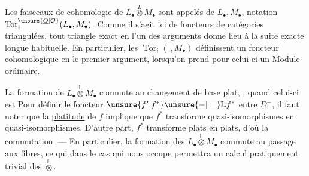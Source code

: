 Les  faisceaux de cohomologie de $L_\bullet\overset{L}{\otimes}M_\bullet$ sont appelés \uline{} de $L_\bullet,M_\bullet$, notation $\operatorname{Tor}_i^{\unsure{\underline O|\mathcal O}}(L_\bullet,M_\bullet)$.  Comme il s'agit ici de foncteurs  de catégories triangulées, tout triangle exact en l'un des arguments donne lieu à la suite exacte longue habituelle. En particulier, les $\operatorname{Tor}_i(\ ,M_\bullet)$ définissent un foncteur cohomologique en le premier argument, lorsqu'on prend pour celui-ci un Module ordinaire.

La formation de $L_\bullet\overset{\mathbb L}{\otimes}M_\bullet$ commute au changement de base \uline{plat}, , quand celui-ci est \deleted{\unsure{défini convenablement} : [\unsure{mais aussi}}
Pour définir le foncteur $\unsure{f'|f^*}\unsure{-|=}\mathbb Lf^*$ entre $D^-$, il faut noter que la \uline{platitude} de $f$ implique que $f^*$ transforme quasi-isomorphismes en quasi-isomorphismes. D'autre part, $f^*$ transforme plats en plats, d'où la commutation.
--- En particulier, la formation des $L_\bullet\overset{\mathbb L}{\otimes}M_\bullet$ commute au passage aux fibres, ce qui dans le cas qui nous occupe permettra  un calcul pratiquement trivial des $\overset{\mathbb L}{\otimes}$.
